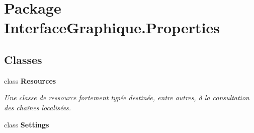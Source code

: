 \hypertarget{namespace_interface_graphique_1_1_properties}{\section{Package Interface\-Graphique.\-Properties}
\label{namespace_interface_graphique_1_1_properties}
}
\subsection*{Classes}
\begin{DoxyCompactItemize}
\item 
class {\bfseries Resources}
\begin{DoxyCompactList}\small\item\em Une classe de ressource fortement typée destinée, entre autres, à la consultation des chaînes localisées. \end{DoxyCompactList}\item 
class {\bfseries Settings}
\end{DoxyCompactItemize}
